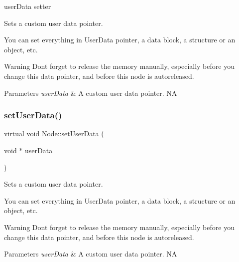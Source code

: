 user\+Data setter 

Sets a custom user data pointer.

You can set everything in User\+Data pointer, a data block, a structure or an object, etc. \begin{DoxyWarning}{Warning}
Don\textquotesingle{}t forget to release the memory manually, especially before you change this data pointer, and before this node is autoreleased.
\end{DoxyWarning}

\begin{DoxyParams}{Parameters}
{\em user\+Data} & A custom user data pointer.  NA \\
\hline
\end{DoxyParams}
\mbox{\label{classNode_a9dd8dc715df27f90ec04f795495836d7}} 
\subsubsection{\texorpdfstring{set\+User\+Data()}{setUserData()}\hspace{0.1cm}{\footnotesize\ttfamily [2/2]}}
{\footnotesize\ttfamily virtual void Node\+::set\+User\+Data (\begin{DoxyParamCaption}\item[{void $\ast$}]{user\+Data }\end{DoxyParamCaption})\hspace{0.3cm}{\ttfamily [virtual]}}

Sets a custom user data pointer.

You can set everything in User\+Data pointer, a data block, a structure or an object, etc. \begin{DoxyWarning}{Warning}
Don\textquotesingle{}t forget to release the memory manually, especially before you change this data pointer, and before this node is autoreleased.
\end{DoxyWarning}

\begin{DoxyParams}{Parameters}
{\em user\+Data} & A custom user data pointer.  NA \\
\hline
\end{DoxyParams}
\mbox{\label{classNode_aa9ccf509ea89dcbd94e3b1d383aeda6f}} 
